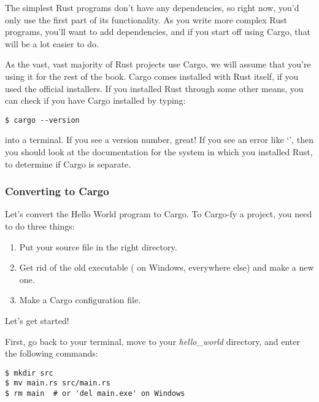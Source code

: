 \blank

The simplest Rust programs don’t have any dependencies, so right now, you'd only use the first part of its functionality. 
As you write more complex Rust programs, you’ll want to add dependencies, and if you start off using Cargo, that will be 
a lot easier to do.

\blank

As the vast, vast majority of Rust projects use Cargo, we will assume that you’re using it for the rest of the book. 
Cargo comes installed with Rust itself, if you used the official installers. If you installed Rust through some other 
means, you can check if you have Cargo installed by typing:

\begin{verbatim}
$ cargo --version
\end{verbatim}

into a terminal. If you see a version number, great! If you see an error like ‘’, then you should look 
at the documentation for the system in which you installed Rust, to determine if Cargo is separate.

\subsubsection*{Converting to Cargo}

Let’s convert the Hello World program to Cargo. To Cargo-fy a project, you need to do three things:

\begin{enumerate}
    \item{Put your source file in the right directory.}
    \item{Get rid of the old executable ( on Windows,  everywhere else) and make a new one.}
    \item{Make a Cargo configuration file.}
\end{enumerate}

Let's get started!


First, go back to your terminal, move to your \emph{hello\_world} directory, and enter the following commands:

\begin{verbatim}
$ mkdir src
$ mv main.rs src/main.rs
$ rm main  # or 'del main.exe' on Windows 
\end{verbatim}

